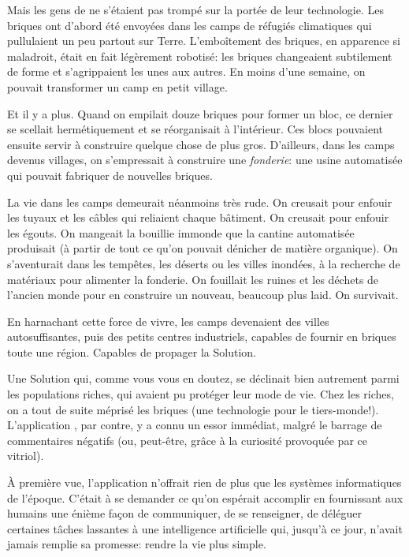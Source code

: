 
Mais les gens de \nomProjet{} ne s'étaient pas trompé sur la portée de
leur technologie.
Les briques ont d'abord été envoyées dans les
camps de réfugiés climatiques qui pullu\-laient un peu partout sur Terre.
L'emboît\-e\-ment des briques, en apparence si maladroit,
était en fait légèrement robotisé: les briques changeaient subtilement de
forme et s'a\-grip\-paient les unes aux autres. En moins d'une semaine, on
pouvait transfor\-mer un camp en petit village.

Et il y a plus. Quand on empilait douze briques pour former un bloc, ce
dernier se scellait hermétiquement et se réorganisait à l'intérieur. Ces
blocs pouvaient ensuite servir à construire quelque chose de plus gros.
D'ailleurs, dans les camps devenus villages, on
s'empressait à construire une \textit{fonderie}: une usine automatisée qui
pouvait fabriquer de nouvelles briques.

La vie dans les camps demeurait néanmoins très rude. On creusait pour
enfouir les tuyaux et les câbles qui reliaient chaque bâtiment. On creusait
pour enfouir les égouts.  On mangeait la bouillie immonde que la cantine
automatisée produisait (à partir de tout ce qu'on pouvait dénicher de
matière organique).  On s'aven\-turait dans les tempêtes, les déserts ou
les villes inondées, à la recherche de matériaux pour alimenter la
fonderie.  On fouillait les ruines et les déchets de l'ancien monde pour en
construire un nouveau, beaucoup plus laid.
On survivait.

En harnachant cette force de vivre, les camps devenaient
des villes autosuffisantes, puis des petits centres industriels, capables
de fournir en briques toute une région. Capables de propager la
Solution.

Une Solution qui, comme vous vous en doutez, se déclinait bien autrement
parmi les populations riches, qui avaient pu protéger leur
mode de vie.  Chez les riches, on a tout de suite méprisé les briques (une
technologie pour le tiers-monde!). L'application \nomProjet{}, par contre,
y a connu un essor immédiat, malgré le barrage de commentaires négatifs (ou,
peut-être, grâce à la curiosité provoquée par ce vitriol).

À première vue, l'application n'offrait rien de plus que
les systèmes informatiques de l'époque. C'était à se demander ce
qu'on espérait accomplir en fournis\-sant aux humains une énième façon de
communiquer, de se renseigner, de déléguer certaines tâches lassantes à une
intelligence artificielle qui, jusqu'à ce jour, n'avait jamais remplie sa
promesse: rendre la vie plus simple.

